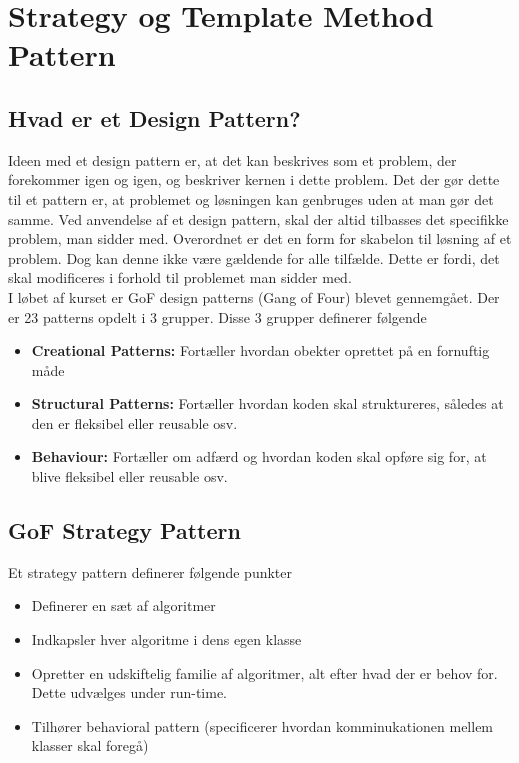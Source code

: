 \documentclass[../report.tex]{subfiles}
\begin{document}
\section{Strategy og Template Method Pattern}

\subsection*{Hvad er et Design Pattern?}
Ideen med et design pattern er, at det kan beskrives som et problem, der forekommer igen og igen, og beskriver kernen i dette problem. Det der gør dette til et pattern er, at problemet og løsningen kan genbruges uden at man gør det samme. Ved anvendelse af et design pattern, skal der altid tilbasses det specifikke problem, man sidder med. Overordnet er det en form for skabelon til løsning af et problem. Dog kan denne ikke være gældende for alle tilfælde. Dette er fordi, det skal modificeres i forhold til problemet man sidder med.
\\

I løbet af kurset er GoF design patterns (Gang of Four) blevet gennemgået. Der er 23 patterns opdelt i 3 grupper. Disse 3 grupper definerer følgende

\begin{itemize}
    \item \textbf{Creational Patterns:} Fortæller hvordan obekter oprettet på en fornuftig måde
    \item \textbf{Structural Patterns:} Fortæller hvordan koden skal struktureres, således at den er fleksibel eller reusable osv.
    \item \textbf{Behaviour:} Fortæller om adfærd og hvordan koden skal opføre sig for, at blive fleksibel eller reusable osv.
\end{itemize}

\subsection*{GoF Strategy Pattern}
Et strategy pattern definerer følgende punkter

\begin{itemize}
    \item Definerer en sæt af algoritmer
    \item Indkapsler hver algoritme i dens egen klasse
    \item Opretter en udskiftelig familie af algoritmer, alt efter hvad der er behov for. Dette udvælges under run-time.
    \item Tilhører behavioral pattern (specificerer hvordan komminukationen mellem klasser skal foregå)
\end{itemize}
\end{document}
